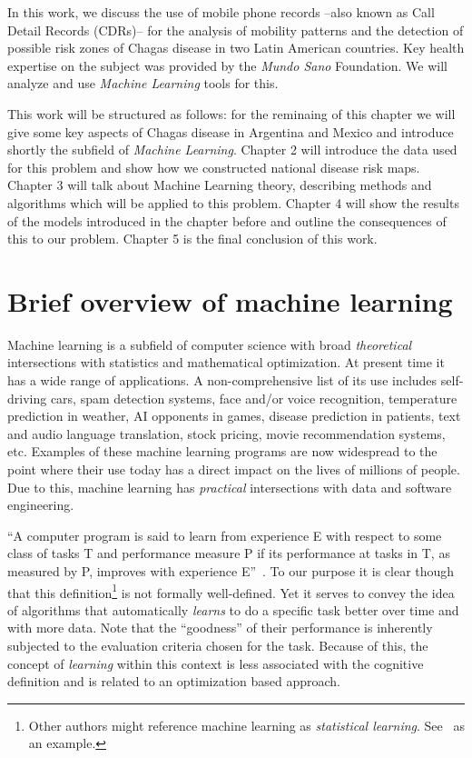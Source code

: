 In this work, we discuss the use of mobile phone records --also known as Call Detail Records (CDRs)-- for the analysis of mobility patterns and the detection of possible risk zones of Chagas disease in two Latin American countries. Key health expertise on the subject was provided by the \textit{Mundo Sano} Foundation. We will analyze and use  \textit{Machine Learning} tools for this.

This work will be structured as follows: for the reminaing of this chapter we will give some key aspects of Chagas disease in Argentina and Mexico and introduce shortly the subfield of \textit{Machine Learning}. Chapter 2 will introduce the data used for this problem and show how we constructed national disease risk maps. Chapter 3 will talk about Machine Learning theory, describing methods and algorithms which will be applied to this problem. Chapter 4 will show the results of the models introduced in the chapter before and outline the consequences of this to our problem. Chapter 5 is the final conclusion of this work.


\section{Brief overview of machine learning}

Machine learning is a subfield of computer science with broad \textit{theoretical} intersections with statistics and mathematical optimization. At present time it has a wide range of applications. A non-comprehensive list of its use includes self-driving cars, spam detection systems, face and/or voice recognition, temperature prediction in weather, AI opponents in games, disease prediction in patients, text and audio language translation, stock pricing, movie recommendation systems, etc. Examples of these machine learning programs are now widespread to the point where their use today has a direct impact on the lives of millions of people. Due to this, machine learning has \textit{practical} intersections with data and software engineering.

``A computer program is said to learn from experience E with respect to some class of tasks T and performance measure P if its performance at tasks in T, as measured by P, improves with experience E''~\cite{Mitchell-MLearning}. To our purpose it is clear though that this definition\footnote{Other authors might reference machine learning as \textit{statistical learning}. See~\cite{hastie-elemstatslearn} as an example.} is not formally well-defined. Yet it serves to convey the idea of algorithms that automatically \textit{learns} to do a specific task better over time and with more data. Note that the ``goodness'' of their performance is inherently subjected to the evaluation criteria chosen for the task. Because of this, the concept of \textit{learning} within this context is less associated with the cognitive definition and is related to an optimization based approach.

